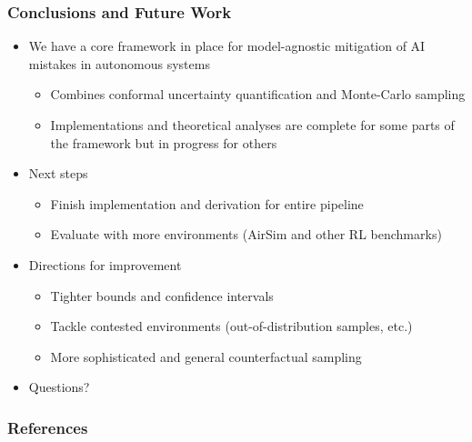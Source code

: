 \documentclass[handout]{beamer}
\begin{document}
\begin{frame}
    \frametitle{Conclusions and Future Work}
    \begin{itemize}
    \item We have a core framework in place for model-agnostic mitigation of AI mistakes in autonomous systems
        \begin{itemize}
        \item Combines conformal uncertainty quantification and Monte-Carlo sampling
        \item Implementations and theoretical analyses are complete for some parts of the framework but in progress for others
        \end{itemize}
    \item Next steps
        \begin{itemize}
        \item Finish implementation and derivation for entire pipeline
        \item Evaluate with more environments (AirSim and other RL benchmarks)
        \end{itemize}
    \item Directions for improvement
        \begin{itemize}
        \item Tighter bounds and confidence intervals
        \item Tackle contested environments (out-of-distribution samples, etc.)
        \item More sophisticated and general counterfactual sampling
        \end{itemize}
    \item Questions?
    \end{itemize}

\end{frame}

\begin{frame}[allowframebreaks]
        \frametitle{References}
        
        
\end{frame}
\end{document}

